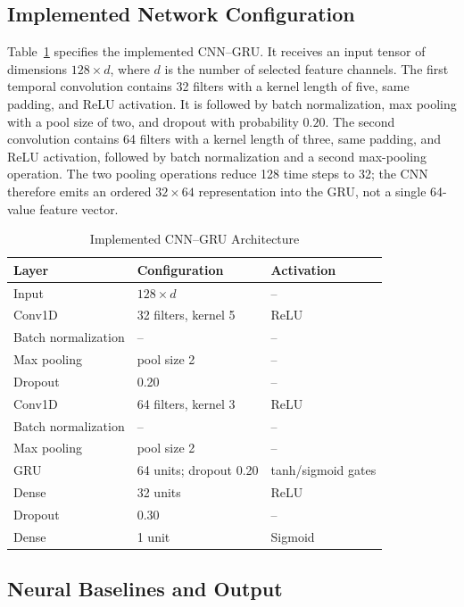 \documentclass[conference]{IEEEtran}
\begin{document}
\subsection{Implemented Network Configuration}

Table~\ref{tab:model_architecture} specifies the implemented CNN--GRU.
It receives an input tensor of dimensions $128\times d$,
where $d$ is the number of selected feature channels. The first temporal
convolution contains 32 filters with a kernel length of five, same padding, and
ReLU activation. It is followed by batch normalization, max pooling with a pool
size of two, and dropout with probability $0.20$. The second convolution
contains 64 filters with a kernel length of three, same padding, and ReLU
activation, followed by batch normalization and a second max-pooling operation.
The two pooling operations reduce 128 time steps to 32; the CNN therefore emits
an ordered $32\times64$ representation into the GRU, not a single 64-value
feature vector.

\begin{table}[t]
\centering
\caption{Implemented CNN--GRU Architecture}
\label{tab:model_architecture}
\begin{tabular}{lll}
\toprule
\textbf{Layer} & \textbf{Configuration} & \textbf{Activation} \\
\midrule
Input & $128\times d$ & -- \\
Conv1D & 32 filters, kernel 5 & ReLU \\
Batch normalization & -- & -- \\
Max pooling & pool size 2 & -- \\
Dropout & 0.20 & -- \\
Conv1D & 64 filters, kernel 3 & ReLU \\
Batch normalization & -- & -- \\
Max pooling & pool size 2 & -- \\
GRU & 64 units; dropout 0.20 & tanh/sigmoid gates \\
Dense & 32 units & ReLU \\
Dropout & 0.30 & -- \\
Dense & 1 unit & Sigmoid \\
\bottomrule
\end{tabular}
\end{table}

\subsection{Neural Baselines and Output}
\end{document}
